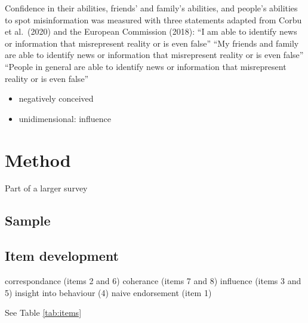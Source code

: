 \documentclass[
  ,jou,floatsintext]{apa6}
\providecommand{\tightlist}{%
  \setlength{\itemsep}{0pt}\setlength{\parskip}{0pt}}
\begin{document}
Confidence in their abilities, friends' and family's abilities, and people's abilities to spot misinformation was measured with three statements adapted from Corbu et al.~(2020) and the European Commission (2018):
``I am able to identify news or information that misrepresent reality or is even false''
``My friends and family are able to identify news or information that misrepresent reality or is even false''
``People in general are able to identify news or information that misrepresent reality or is even false''

\begin{itemize}
\tightlist
\item
  negatively conceived
\item
  unidimensional: influence
\end{itemize}

\hypertarget{method}{%
\section{Method}\label{method}}

Part of a larger survey

\hypertarget{sample}{%
\subsection{Sample}\label{sample}}

\hypertarget{item-development}{%
\subsection{Item development}\label{item-development}}

correspondance (items 2 and 6)
coherance (items 7 and 8)
influence (items 3 and 5)
insight into behaviour (4)
naive endorsement (item 1)

See Table \ref{tab:items}
\end{document}
